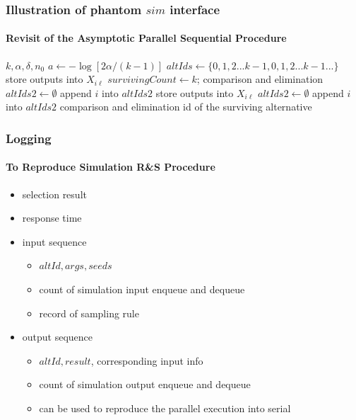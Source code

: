 \documentclass{beamer}
\begin{document}
\begin{frame}
\frametitle{Illustration of phantom $sim$ interface}
\framesubtitle{Revisit of the Asymptotic Parallel Sequential Procedure}
\tiny
{
\begin{algorithmic}[1]
\Require $k, \alpha, \delta, n_0$
\State $a \gets - \log{[2\alpha / (k - 1)]}$
\State $altIds \gets \{0, 1, 2...k - 1, 0, 1, 2...k - 1...\}$ 
\State store outputs into $X_{i\ell}$
\State $survivingCount \gets k$;
\State comparison and elimination
\State $altIds2 \gets \emptyset$
    \State append $i$ into $altIds2$
  \EndIf
\EndFor
{}
  \State store {\color{blue} outputs} into $X_{i\ell}$
    \State $altIds2 \gets \emptyset$
        \State append $i$ into $altIds2$
      \EndIf
    \EndFor
    \State comparison and elimination
  \EndIf
\EndWhile
\State \Return id of the surviving alternative
\end{algorithmic}
}
\end{frame}

\begin{frame}
\frametitle{Logging}
\framesubtitle{To Reproduce Simulation R\&S Procedure}
\begin{itemize}
\item selection result
\item response time
\item input sequence
\begin{itemize}
\item $altId, args, seeds$
\item count of simulation input enqueue and dequeue
\item record of sampling rule
\end{itemize}
\item output sequence
\begin{itemize}
\item $altId, result$, corresponding input info
\item count of simulation output enqueue and dequeue
\item {\color{blue} can be used to reproduce the parallel execution into serial}
\end{itemize}
\end{itemize}
\end{frame}
\end{document}
